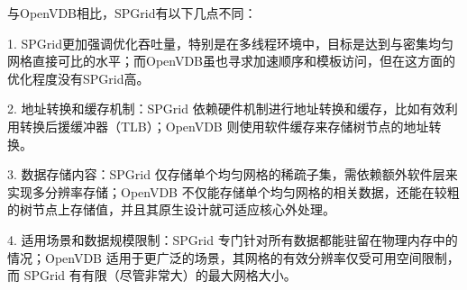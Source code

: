 与OpenVDB相比，SPGrid有以下几点不同：

1. SPGrid更加强调优化吞吐量，特别是在多线程环境中，目标是达到与密集均匀网格直接可比的水平；而OpenVDB虽也寻求加速顺序和模板访问，但在这方面的优化程度没有SPGrid高。

2. 地址转换和缓存机制：SPGrid 依赖硬件机制进行地址转换和缓存，比如有效利用转换后援缓冲器（TLB）；OpenVDB 则使用软件缓存来存储树节点的地址转换。

3. 数据存储内容：SPGrid 仅存储单个均匀网格的稀疏子集，需依赖额外软件层来实现多分辨率存储；OpenVDB 不仅能存储单个均匀网格的相关数据，还能在较粗的树节点上存储值，并且其原生设计就可适应核心外处理。

4. 适用场景和数据规模限制：SPGrid 专门针对所有数据都能驻留在物理内存中的情况；OpenVDB 适用于更广泛的场景，其网格的有效分辨率仅受可用空间限制，而 SPGrid 有有限（尽管非常大）的最大网格大小。